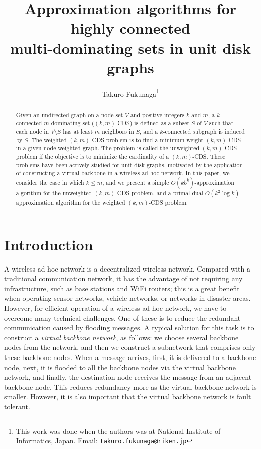 \documentclass[11pt]{article}
\begin{document}
\title{Approximation algorithms for highly
connected \\ multi-dominating sets in unit disk graphs}

\author{Takuro Fukunaga\thanks{This work was done when the authors
was at National Institute of Informatics, Japan. Email: {\tt takuro.fukunaga@riken.jp}}}

\date{}


\maketitle

\begin{abstract}
  Given an undirected graph on a node set $V$
  and positive integers $k$ and $m$,
  a $k$-connected $m$-dominating set ($(k,m)$-CDS)
  is defined as a subset $S$ of $V$ 
  such that each node in $V \setminus S$
  has at least $m$ neighbors in $S$, and
 a $k$-connected subgraph is induced by $S$.
  The weighted $(k,m)$-CDS problem is to
  find a minimum weight $(k,m)$-CDS
  in a given node-weighted graph.
  The problem is called
  the unweighted $(k,m)$-CDS problem
  if the objective
  is to minimize the cardinality of a $(k,m)$-CDS.
  These problems
  have been actively studied for unit disk graphs,
  motivated by the application of constructing a virtual backbone 
  in a wireless ad hoc network.
In this paper,
  we consider the case in which $k \leq m$,
  and we present a simple
  $O(k5^k)$-approximation algorithm for the unweighted $(k,m)$-CDS
 problem,
 and a primal-dual $O(k^2 \log k)$-approximation algorithm for the
 weighted $(k,m)$-CDS problem. 
 \end{abstract}


 
\section{Introduction}
\label{sec.intro}


A wireless ad hoc network is a decentralized wireless network.
Compared with a traditional communication
network, it has the advantage of not requiring
any infrastructure, such as base stations and WiFi routers; this is a
great benefit when operating sensor networks, vehicle networks, or
networks in disaster areas.  However, for efficient operation of a
wireless ad hoc network, we have to overcome many technical challenges.
One of these is to reduce the redundant communication caused by flooding
messages.  
A typical solution 
for this task
is to construct a
\emph{virtual backbone network}, as follows:
we choose several backbone nodes from the network,
and then we construct a subnetwork that comprises only these backbone nodes.
When a message arrives, first, it is delivered to a backbone node,
next, it is flooded to all the backbone nodes via the virtual backbone
network,
and finally, the destination node receives the message from an adjacent backbone node.
This reduces redundancy more as the virtual backbone network is
smaller.
However, it is also important that the virtual backbone network
is fault tolerant.
\end{document}
